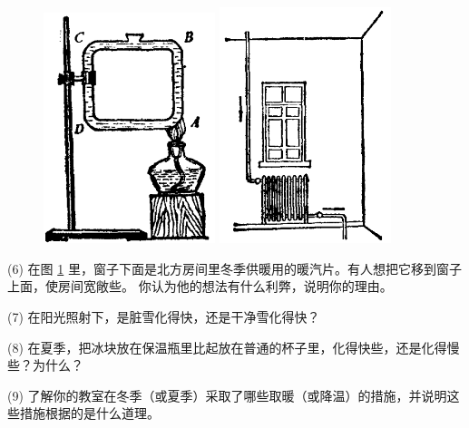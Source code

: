 \begin{figure}[htbp]
    \centering
    \begin{minipage}{7cm}
    \centering
    \includegraphics[width=5cm]{../pic/czwl2-ch2-23}
    \caption{}\label{fig:2-23}
    \end{minipage}
    \qquad
    \begin{minipage}{7cm}
    \centering
    \includegraphics[width=5cm]{../pic/czwl2-ch2-24}
    \caption{}\label{fig:2-24}
    \end{minipage}
\end{figure}

(6) 在图 \ref{fig:2-24} 里，窗子下面是北方房间里冬季供暖用的暖汽片。有人想把它移到窗子上面，使房间宽敞些。
你认为他的想法有什么利弊，说明你的理由。

(7) 在阳光照射下，是脏雪化得快，还是干净雪化得快？

(8) 在夏季，把冰块放在保温瓶里比起放在普通的杯子里，化得快些，还是化得慢些？为什么？

(9) 了解你的教室在冬季（或夏季）采取了哪些取暖（或降温）的措施，并说明这些措施根据的是什么道理。

